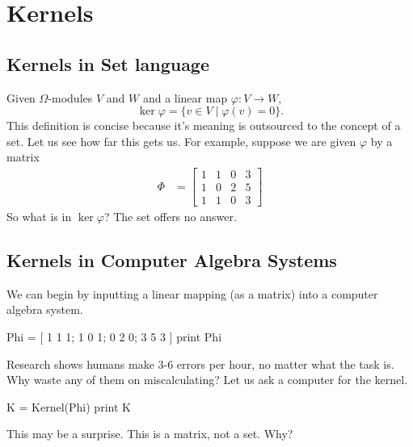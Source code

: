 \documentclass[12pt,twoside,dvipsnames,letterpaper]{memoir}
\begin{document}
\section{Kernels}

\subsection{Kernels in Set language}
Given $\Omega$-modules $V$ and $W$ and a linear map $\varphi:V\to W$, 
\[
    \ker \varphi=\{v\in V\mid \varphi(v)=0\}.
\]
This definition is concise because it's meaning
is outsourced to the concept of a set. Let us see how 
far this gets us. 
For example, suppose we are given $\varphi$ by a matrix 
\begin{align*}
    \Phi & = 
    \begin{bmatrix}
        1 & 1 & 0 & 3\\
        1 & 0 & 2 & 5\\
        1 & 1 & 0 & 3
    \end{bmatrix}
\end{align*}
So what is in $\ker\varphi$?  The set 
offers no answer.


\subsection{Kernels in Computer Algebra Systems}
We can begin by inputting a linear mapping (as a matrix) into a computer algebra
system.
\begin{notebookin}
Phi = [ 1 1 1; 1 0 1; 0 2 0; 3 5 3 ]
print Phi
\end{notebookin}
\begin{notebookout}[\thenotebookcounter]
[ 1 1 0 3 ]
[ 1 0 2 5 ]
[ 1 1 0 3 ]
\end{notebookout}
Research shows humans make 3-6 errors per hour, no matter 
what the task is.  Why waste any of 
them on miscalculating?  Let us ask a computer for the kernel.
\begin{notebookin}
K = Kernel(Phi)
print K
\end{notebookin}
\begin{notebookout}[\thenotebookcounter]
[ -2 -5 ]
[  2  2 ]
[  1  0 ]
[  0  1 ]
\end{notebookout}
This may be a surprise.  This is a matrix, not a 
set.  Why?
\end{document}

